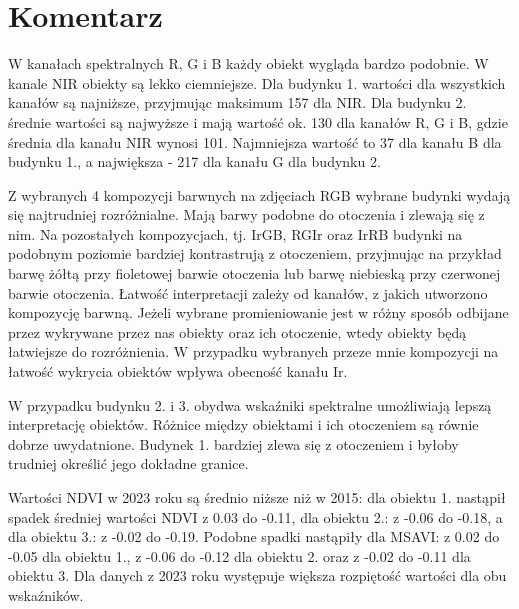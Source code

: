 \documentclass[a4paper,12pt]{article}  %
\begin{document}
\newpage
\section{Komentarz}

W kanałach spektralnych R, G i B każdy obiekt wygląda bardzo podobnie. W kanale NIR obiekty są lekko ciemniejsze. Dla budynku 1. wartości dla wszystkich kanałów są najniższe, przyjmując maksimum 157 dla NIR. Dla budynku 2. średnie wartości są najwyższe i mają wartość ok. 130 dla kanałów R, G i B, gdzie średnia dla kanału NIR wynosi 101. Najmniejsza wartość to 37 dla kanału B dla budynku 1., a największa - 217 dla kanału G dla budynku 2.

Z wybranych 4 kompozycji barwnych na zdjęciach RGB wybrane budynki wydają się najtrudniej rozróżnialne. Mają barwy podobne do otoczenia i zlewają się z nim. Na pozostałych kompozycjach, tj. IrGB, RGIr oraz IrRB budynki na podobnym poziomie bardziej kontrastrują z otoczeniem, przyjmując na przykład barwę żółtą przy fioletowej barwie otoczenia lub barwę niebieską przy czerwonej barwie otoczenia. Łatwość interpretacji zależy od kanałów, z jakich utworzono kompozycję barwną. Jeżeli wybrane promieniowanie jest w różny sposób odbijane przez wykrywane przez nas obiekty oraz ich otoczenie, wtedy obiekty będą łatwiejsze do rozróżnienia. W przypadku wybranych przeze mnie kompozycji na łatwość wykrycia obiektów wpływa obecność kanału Ir.

W przypadku budynku 2. i 3. obydwa wskaźniki spektralne umożliwiają lepszą interpretację obiektów. Różnice między obiektami i ich otoczeniem są równie dobrze uwydatnione. Budynek 1. bardziej zlewa się z otoczeniem i byłoby trudniej określić jego dokładne granice.

Wartości NDVI w 2023 roku są średnio niższe niż w 2015: dla obiektu 1. nastąpił spadek średniej wartości NDVI z 0.03 do -0.11, dla obiektu 2.: z -0.06 do -0.18, a dla obiektu 3.: z -0.02 do -0.19. Podobne spadki nastąpiły dla MSAVI: z 0.02 do -0.05 dla obiektu 1., z -0.06 do -0.12 dla obiektu 2. oraz z -0.02 do -0.11 dla obiektu 3. Dla danych z 2023 roku występuje większa rozpiętość wartości dla obu wskaźników.
\end{document}
